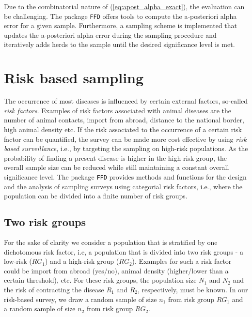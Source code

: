 \documentclass[nojss]{jss}
\begin{document}
Due to the combinatorial nature of (\ref{eq:apost_alpha_exact}), the evaluation can be challenging. The package \texttt{FFD} offers tools to compute the a-posteriori alpha error for a given sample. Furthermore, a sampling scheme is implemented that updates the a-posteriori alpha error during the sampling procedure and iteratively adds herds to the sample until the desired significance level is met.


\section{Risk based sampling} \label{sec:riskbased}

The occurrence of most diseases is influenced by certain external factors, so-called \emph{risk factors}. Examples of risk factors associated with animal diseases are the number of animal contacts, import from abroad, distance to the national border, high animal density etc. If the risk associated to the occurrence of a certain risk factor can be quantified, the survey can be made more cost effective by using \emph{risk based surveillance}, i.e., by targeting the sampling on high-risk populations. As the probability of finding a present disease is higher in the high-risk group, the overall sample size can be reduced while still maintaining a constant overall significance level. The package \texttt{FFD} provides methods and functions for the design and the analysis of sampling surveys using categorial risk factors, i.e., where the population can be divided into a finite number of risk groups.

%

\subsection{Two risk groups}\label{subsec:2_risk_goups}

For the sake of clarity we consider a population that is stratified by one dichotomous risk factor, i.e, a population that is divided into two risk groups - a low-risk ($RG_1$) and a high-risk group ($RG_2$). Examples for such a risk factor could be import from abroad (yes/no), animal density (higher/lower than a certain threshold), etc. For these risk groups, the population size $N_1$ and $N_2$ and the risk of contracting the disease $R_1$ and $R_2$, respectively, must be known. In our risk-based survey, we draw a random sample of size $n_1$ from risk group $RG_1$ and a random sample of size $n_2$ from risk group $RG_2$.
\end{document}
